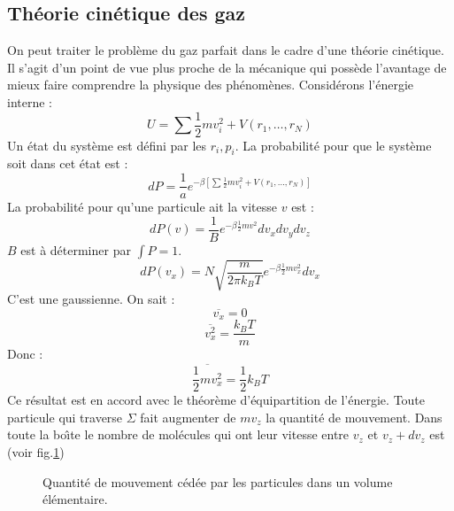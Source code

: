 \documentclass[12pt]{book}
\begin{document}
\subsection{Th\'eorie cin\'etique des gaz}
On peut traiter le probl\`eme du gaz parfait dans
le cadre d'une 
th\'eorie cin\'etique. Il s'agit d'un
point de vue plus proche  
de la m\'ecanique qui poss\`ede  l'avantage de mieux faire comprendre
la physique des ph\'enom\`enes.
Consid\'erons l'\'energie interne :
\begin{equation}
U=\sum \frac{1}{2}mv_i^2+V(r_1,\dots,r_N)
\end{equation}
Un \'etat du syst\`eme est d\'efini par les $r_i,p_i$. La
probabilit\'e pour que le syst\`eme soit dans cet \'etat est :
\begin{equation}
dP=\frac{1}{a}e^{-\beta[\sum \frac{1}{2}mv_i^2+V(r_1,\dots,r_N)]}
\end{equation}
La probabilit\'e pour qu'une particule ait la vitesse $v$ est :
\begin{equation}
dP(v)=\frac{1}{B}e^{-\beta \frac{1}{2}mv^2}dv_xdv_ydv_z
\end{equation}
$B$ est \`a d\'eterminer par $\int P =1$.
\begin{equation}
dP(v_x)=N\sqrt{\frac{m}{2\pi k_BT}}e^{-\beta \frac{1}{2}mv_x^2}dv_x
\end{equation}
C'est une gaussienne. On sait :
\begin{equation}
\overline{v_x}=0
\end{equation}
\begin{equation}
\overline{v^2_x}=\frac{k_BT}{m}
\end{equation}
Donc :
\begin{equation}
\overline{\frac{1}{2}mv^2_x}=\frac{1}{2}k_BT
\end{equation}
Ce r\'esultat est en accord avec le th\'eor\`eme d'\'equipartition de
l'\'energie. Toute particule qui traverse $\Sigma$ fait augmenter  de
$mv_z$ la quantit\'e de mouvement.
Dans toute la bo\^\i te le nombre de mol\'ecules qui ont leur vitesse entre
$v_z$ et $v_z+dv_z$ est (voir fig.\ref{figboite})
\begin{figure}[htb]
 \centerline{}   
 \caption{Quantit\'e de mouvement c\'ed\'ee par les particules dans un
volume \'el\'ementaire.}
 \label{figboite}
\end{figure}
\end{document}
